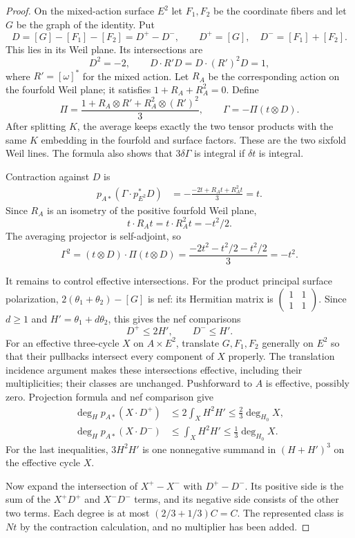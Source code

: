 \begin{proof}
On the mixed-action surface $E^2$ let $F_1,F_2$ be the coordinate fibers and let $G$ be the graph of the identity. Put
\[
D=[G]-[F_1]-[F_2]=D^+-D^-,\qquad
D^+=[G],\quad D^-=[F_1]+[F_2].
\]
This lies in its Weil plane. Its intersections are
\[
D^2=-2,\qquad D\cdot R'D=D\cdot(R')^2D=1,
\]
where $R'=[\omega]^*$ for the mixed action. Let $R_A$ be the corresponding action on the fourfold Weil plane; it satisfies $1+R_A+R_A^2=0$. Define
\[
\Pi=\frac{1+R_A\otimes R'+R_A^2\otimes(R')^2}{3},
\qquad \Gamma=-\Pi(t\otimes D).
\]
After splitting $K$, the average keeps exactly the two tensor products with the same $K$ embedding in the fourfold and surface factors. These are the two sixfold Weil lines. The formula also shows that $3\delta\Gamma$ is integral if $\delta t$ is integral.

Contraction against $D$ is
\begin{align*}
p_{A*}(\Gamma\cdot p_{E^2}^*D)
&=-\frac{-2t+R_At+R_A^2t}{3}=t.
\end{align*}
Since $R_A$ is an isometry of the positive fourfold Weil plane,
\[
t\cdot R_At=t\cdot R_A^2t=-t^2/2.
\]
The averaging projector is self-adjoint, so
\[
\Gamma^2
=(t\otimes D)\cdot\Pi(t\otimes D)
=\frac{-2t^2-t^2/2-t^2/2}{3}=-t^2.
\]

It remains to control effective intersections. For the product principal surface polarization, $2(\theta_1+\theta_2)-[G]$ is nef: its Hermitian matrix is $\left(\begin{smallmatrix}1&1\\1&1\end{smallmatrix}\right)$. Since $d\geq1$ and $H'=\theta_1+d\theta_2$, this gives the nef comparisons
\[
D^+\leq2H',\qquad D^-\leq H'.
\]
For an effective three-cycle $X$ on $A\times E^2$, translate $G,F_1,F_2$ generally on $E^2$ so that their pullbacks intersect every component of $X$ properly. The translation incidence argument makes these intersections effective, including their multiplicities; their classes are unchanged. Pushforward to $A$ is effective, possibly zero. Projection formula and nef comparison give
\begin{align*}
\deg_Hp_{A*}(X\cdot D^+)&\leq2\int_XH^2H'
\leq\frac23\deg_{H_0}X,\\
\deg_Hp_{A*}(X\cdot D^-)&\leq\int_XH^2H'
\leq\frac13\deg_{H_0}X.
\end{align*}
For the last inequalities, $3H^2H'$ is one nonnegative summand in $(H+H')^3$ on the effective cycle $X$.

Now expand the intersection of $X^+-X^-$ with $D^+-D^-$. Its positive side is the sum of the $X^+D^+$ and $X^-D^-$ terms, and its negative side consists of the other two terms. Each degree is at most $(2/3+1/3)C=C$. The represented class is $Nt$ by the contraction calculation, and no multiplier has been added.
\end{proof}

